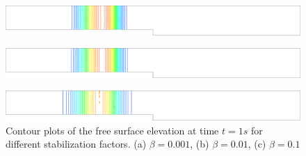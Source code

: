 \documentclass[a4paper,12pt]{article}
\begin{document}

\begin{figure}[H]
\begin{subfigure}{.05\textwidth}
    \caption{}
\end{subfigure}
\begin{minipage}[c]{.94\textwidth}
    \includegraphics[width=\textwidth]{img/step/stab_0.001_time_1.pdf}        
\end{minipage}
\par\medskip
\begin{subfigure}{.05\textwidth}
    \caption{}
\end{subfigure}
\begin{minipage}[c]{.94\textwidth}
    \includegraphics[width=\textwidth]{img/step/stab_0.01_time_1.pdf}        
\end{minipage}
\par\medskip
\begin{subfigure}{.05\textwidth}
    \caption{}
\end{subfigure}
\begin{minipage}[c]{.94\textwidth}
    \includegraphics[width=\textwidth]{img/step/stab_0.1_time_1.pdf}        
\end{minipage}
\caption{Contour plots of the free surface elevation at time $t=1s$ for different stabilization factors. (a) $\beta=0.001$, (b) $\beta=0.01$, (c) $\beta=0.1$}
\label{stab_parameters_time1}
\end{figure}
\end{document}
